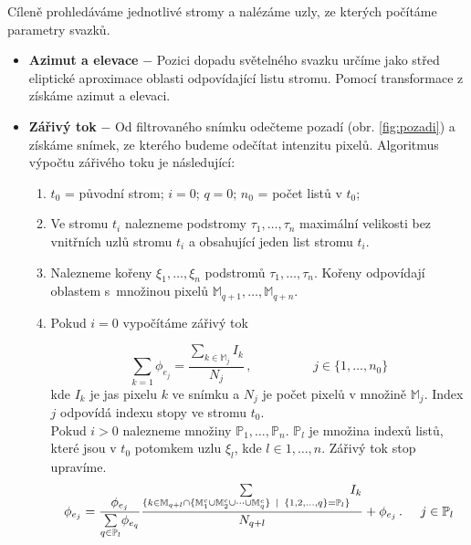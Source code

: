 Cíleně prohledáváme jednotlivé stromy a nalézáme uzly, ze kterých počítáme parametry svazků.

\begin{itemize}
	\item \textbf{Azimut a elevace} $-$ Pozici dopadu světelného svazku určíme jako střed eliptické aproximace oblasti odpovídající listu stromu. Pomocí transformace z \cite{Drapela} získáme azimut a elevaci.
	
	\item \textbf{Zářivý tok} $-$ Od filtrovaného snímku odečteme pozadí (obr. \ref{fig:pozadi}) a získáme snímek, ze kterého budeme odečítat intenzitu pixelů. Algoritmus výpočtu zářivého toku je ná\-sle\-du\-jí\-cí:
	\begin{enumerate}
	\item $t_0$ = původní strom; $i = 0$; $q = 0$; $n_0$ = počet listů v $t_0$;
	
	\item Ve stromu $t_i$ nalezneme podstromy $\tau_1,\dots,\tau_n$ maximální velikosti bez vnitřních uzlů stromu $t_i$ a obsahující jeden list stromu $t_i$.  
	
	\item Nalezneme kořeny $\xi_1,\dots,\xi_n$ podstromů $\tau_1,\dots,\tau_n$. Kořeny odpovídají oblastem s~množinou pixelů $\mathbb{M}_{q+1},\dots,\mathbb{M}_{q+n}$.
	
	\item Pokud $i = 0$ vypočítáme zářivý tok 
	
	\begin{equation}
	\underset{{k = 1}}{\sum}
	\phi_{e_j} = \frac{\underset{k\in\mathbb{M}_j}{\sum}I_k}{N_j}\,,\hspace{2cm} j\in\lbrace1,\dots,n_0\rbrace
	\end{equation}
	kde $I_k$ je jas pixelu $k$ ve snímku a $N_j$ je počet pixelů v množině $\mathbb{M}_j$. Index $j$ odpovídá indexu stopy ve stromu $t_0$.\\
	
	Pokud $i > 0$ nalezneme množiny $\mathbb{P}_1,\dots,\mathbb{P}_n$. $\mathbb{P}_l$ je množina indexů listů, které jsou v $t_0$ potomkem uzlu $\xi_l$, kde $l\in {1,\dots,n}$. Zářivý tok stop upravíme.  
	 \begin{equation}
	\phi_{e_j} = \frac{\phi_{e_j}}{\underset{q\in \mathbb{P}_l}{\sum}\phi_{e_q}}\frac{\underset{{\lbrace k\in\mathbb{M}_{q+l}\cap\lbrace \mathbb{M}_1^c \cup \mathbb{M}_2^c \cup \dots \cup \mathbb{M}_q^c \rbrace\hspace{1.5mm}|\hspace{1.5mm} \lbrace1,2,\dots,q\rbrace = \mathbb{P}_l \rbrace}}{\sum} I_k}{N_{q+l}} + \phi_{e_j}\,.\hspace{0.5cm} j\in \mathbb{P}_l
	\end{equation}
	

\end{enumerate}
\end{itemize}
